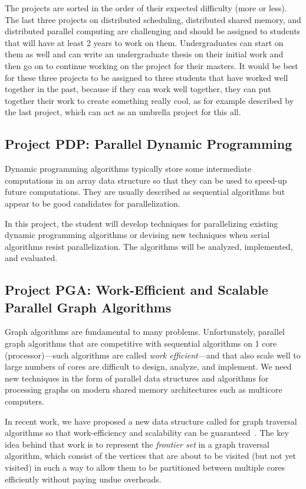 \documentclass[11pt]{article}
\begin{document}
The projects are sorted in the order of their expected difficulty
(more or less). The last three projects on distributed scheduling,
distributed shared memory, and distributed parallel computing are
challenging and should be assigned to students that will have at least
2 years to work on them. Undergraduates can start on them as well and
can write an undergraduate thesis on their initial work and then go on
to continue working on the project for their masters.  It would be
best for these three projects to be assigned to three students that
have worked well together in the past, because if they can work well
together, they can put together their work to create something really
cool, as for example described by the last project, which can act as
an umbrella project for this all.



\subsection{Project PDP: Parallel Dynamic Programming}
Dynamic programming algorithms typically store some intermediate
computations in an array data structure so that they can be used to
speed-up future computations.  They are usually described as
sequential algorithms but appear to be good candidates for
parallelization.  

In this project, the student will develop techniques for parallelizing
existing dynamic programming algorithms or devising new techniques
when serial algorithms resist parallelization.  The algorithms will be
analyzed, implemented, and evaluated.

\subsection{Project PGA: Work-Efficient and Scalable Parallel Graph
  Algorithms}

Graph algorithms are fundamental to many problems.  Unfortunately,
parallel graph algorithms that are competitive with sequential
algorithms on 1 core (processor)---such algorithms are called {\em
  work efficient}---and that also scale well to large numbers of cores
are difficult to design, analyze, and implement.  We need new
techniques in the form of parallel data structures and algorithms for
processing graphs on modern shared memory architectures such as
multicore computers.

In recent work, we have proposed a new data structure called for graph
traversal algorithms so that work-efficiency and scalability can be
guaranteed~\cite{AcarChRa14-graphs}.  The key idea behind that work is
to represent the {\em frontier set} in a graph traversal algorithm,
which consist of the vertices that are about to be visited (but not
yet visited) in such a way to allow them to be partitioned between
multiple cores efficiently without paying undue overheads.
\end{document}

